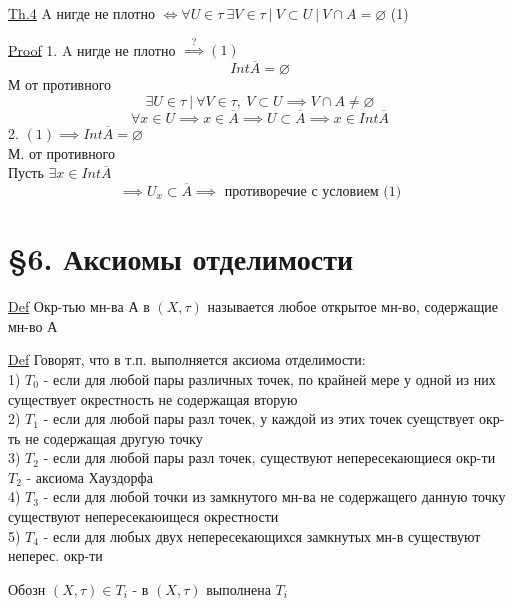 \documentclass[a4paper]{article}
\begin{document}
\begin{tcolorbox}
\underline{Th.4} A нигде не плотно $ \iff \forall U \in \tau \ \exists V \in \tau
\ | \ V \subset U \ | \ V\cap A = \varnothing$  (1)

\underline{Proof} 1. A нигде не плотно $ \stackrel{?}{\implies} (1) $ 
\[
    Int \overline{A} = \varnothing
\]
М от противного
\[
    \exists U \in \tau  \ | \ \forall V \in \tau, \  V \subset U \implies
    V \cap A \neq \varnothing
\]
\[
    \forall x \in U \implies x \in \overline{A} \implies U \subset \overline{A}
    \implies x \in Int \overline{A}
\]
2. $ (1) \implies Int \overline{A} = \varnothing $ \\
М. от противного\\
Пусть $ \exists x \in Int \overline{A}  $ 
\[
    \implies U_x \subset \overline{A} \implies \text{ противоречие с условием (1)}
\]
\end{tcolorbox}

\section*{\centering \S 6. Аксиомы отделимости}

\begin{tcolorbox}
\underline{Def} Окр-тью мн-ва А в $ (X, \tau) $ называется любое открытое мн-во,
содержащие мн-во А
\end{tcolorbox}

\begin{tcolorbox}
\underline{Def} Говорят, что в т.п. выполняется аксиома отделимости:\\
1) $ T_0 $ - если для любой пары различных точек, по крайней мере у одной из них существует
окрестность не содержащая вторую\\
2) $ T_1 $ - если для любой пары разл точек, у каждой из этих точек суещствует
окр-ть не содержащая другую точку\\
3) $ T_2 $ - если для любой пары разл точек, существуют непересекающиеся окр-ти\\
$ T_2 $ - аксиома Хауздорфа\\
4) $ T_3 $ - если для любой точки из замкнутого мн-ва не содержащего данную точку
существуют непересекаюищеся окрестности\\
5) $ T_4 $ - если для любых двух непересекающихся замкнутых мн-в существуют неперес.
окр-ти

Обозн $ (X, \tau) \in T_i $ - в $ (X, \tau) $ выполнена $ T_i $ 
\end{tcolorbox}
\end{document}
